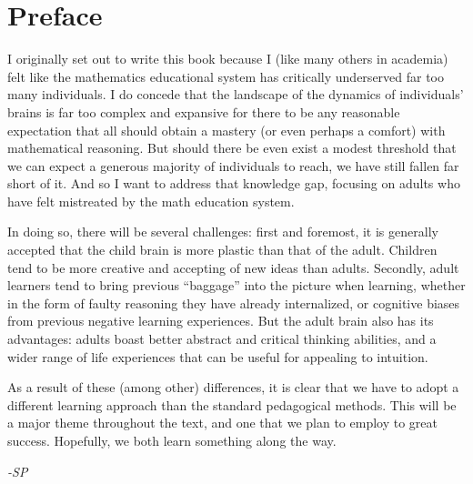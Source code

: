 \chapter*{Preface}

I originally set out to write this book because I (like many others in academia)
felt like the mathematics educational system has critically underserved far too
many individuals. I do concede that the landscape of the dynamics of individuals'
brains is far too complex and expansive for there to be any reasonable expectation
that all should obtain a mastery (or even perhaps a comfort) with mathematical
reasoning. But should there be even exist a modest threshold that we can expect a
generous majority of individuals to reach, we have still fallen far short of it.
And so I want to address that knowledge gap, focusing on adults who have felt
mistreated by the math education system.

In doing so, there will be several challenges: first and foremost, it is generally
accepted that the child brain is more plastic than that of the adult. Children
tend to be more creative and accepting of new ideas than adults. Secondly, adult
learners tend to bring previous ``baggage'' into the picture when learning, whether
in the form of faulty reasoning they have already internalized, or cognitive
biases from previous negative learning experiences. But the adult brain also has
its advantages: adults boast better abstract and critical thinking abilities,
and a wider range of life experiences that can be useful for appealing to intuition.

As a result of these (among other) differences, it is clear that we have to adopt
a different learning approach than the standard pedagogical methods. This will be
a major theme throughout the text, and one that we plan to employ to great success.
Hopefully, we both learn something along the way.

\flushright
\textit{-SP}
\flushleft
